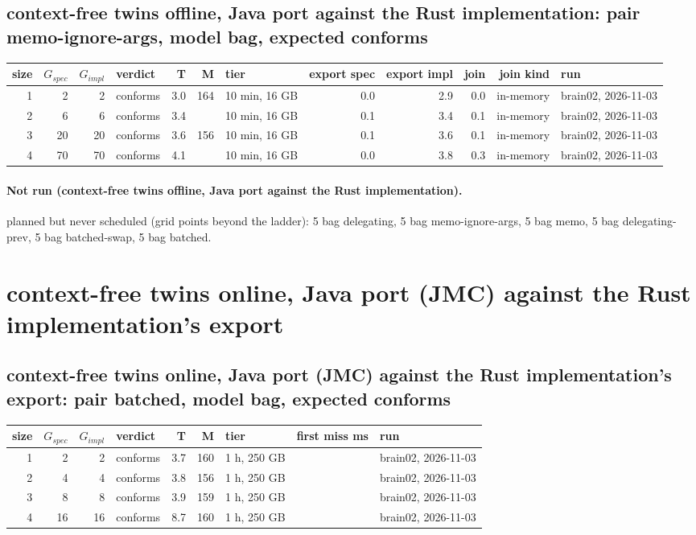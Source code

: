 \documentclass[10pt]{article}
\begin{document}
\subsection*{context-free twins offline, Java port against the Rust implementation: pair \textsf{memo-ignore-args}, model bag, expected conforms}
\begin{longtable}{@{}rrrlrrlrrrrl@{}}
\toprule
size & $G_{\mathit{spec}}$ & $G_{\mathit{impl}}$ & verdict & T & M & tier & export spec & export impl & join & join kind & run \\
\midrule
\endhead
\color{red} 1 & 2 & 2 & conforms & 3.0 & 164 & 10 min, 16 GB & 0.0 & 2.9 & 0.0 & in-memory & brain02, 2026-11-03 \\
\color{red} 2 & 6 & 6 & conforms & 3.4 &  & 10 min, 16 GB & 0.1 & 3.4 & 0.1 & in-memory & brain02, 2026-11-03 \\
\color{red} 3 & 20 & 20 & conforms & 3.6 & 156 & 10 min, 16 GB & 0.1 & 3.6 & 0.1 & in-memory & brain02, 2026-11-03 \\
\color{red} 4 & 70 & 70 & conforms & 4.1 &  & 10 min, 16 GB & 0.0 & 3.8 & 0.3 & in-memory & brain02, 2026-11-03 \\
\bottomrule
\end{longtable}
\paragraph{Not run (context-free twins offline, Java port against the Rust implementation).}
planned but never scheduled (grid points beyond the ladder): 5 bag delegating, 5 bag memo-ignore-args, 5 bag memo, 5 bag delegating-prev, 5 bag batched-swap, 5 bag batched.\par
\section*{context-free twins online, Java port (JMC) against the Rust implementation's export}
\subsection*{context-free twins online, Java port (JMC) against the Rust implementation's export: pair \textsf{batched}, model bag, expected conforms}
\begin{longtable}{@{}rrrlrrlrl@{}}
\toprule
size & $G_{\mathit{spec}}$ & $G_{\mathit{impl}}$ & verdict & T & M & tier & first miss ms & run \\
\midrule
\endhead
\color{red} 1 & 2 & 2 & conforms & 3.7 & 160 & 1 h, 250 GB &  & brain02, 2026-11-03 \\
\color{red} 2 & 4 & 4 & conforms & 3.8 & 156 & 1 h, 250 GB &  & brain02, 2026-11-03 \\
\color{red} 3 & 8 & 8 & conforms & 3.9 & 159 & 1 h, 250 GB &  & brain02, 2026-11-03 \\
\color{red} 4 & 16 & 16 & conforms & 8.7 & 160 & 1 h, 250 GB &  & brain02, 2026-11-03 \\
\bottomrule
\end{longtable}
\end{document}
